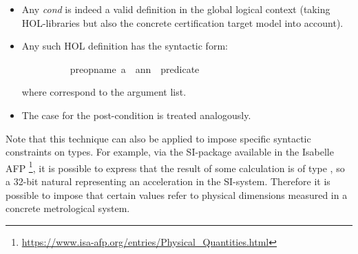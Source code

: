 \begin{isabellebody}
\begin{isamarkuptext}
%
\begin{itemize}%
\item Any \emph{cond} is indeed a valid definition in the global logical context
(taking HOL-libraries but also the concrete certification target model into account).

\item Any such HOL definition has the syntactic form:
\vspace{-0.3cm}

\begin{isabelle}
\ \ \ \ \ \ \ \ \ \ pre{\isacharunderscore}{\kern0pt}{\isacharless}{\kern0pt}op{\isacharunderscore}{\kern0pt}name{\isachargreater}{\kern0pt}\ {\isacharparenleft}{\kern0pt}a\ {\isachardot}{\kern0pt}{\isachardot}{\kern0pt}{\isachardot}{\kern0pt}\ {\isacharparenleft}{\kern0pt}a\isactrlsub n{\isacharcolon}{\kern0pt}{\isacharcolon}{\kern0pt}{\isasymtau}\isactrlsub n{\isacharparenright}{\kern0pt}\ {\isasymequiv}\ {\isacharless}{\kern0pt}predicate{\isachargreater}{\kern0pt}{\isacharcomma}{\kern0pt}
\end{isabelle}
\vspace{-0.3cm}
where  correspond to the argument list.

\item The case for the post-condition is treated analogously. %
\end{itemize}
\end{isamarkuptext}\isamarkuptrue%

\begin{isamarkuptext}
Note that this technique can also be applied to impose specific syntactic constraints on
types. For example, via the SI-package available in the Isabelle AFP
\footnote{\url{https://www.isa-afp.org/entries/Physical_Quantities.html}}, it is possible to express
that the result of some calculation is of type
, so a 32-bit natural representing an acceleration in the SI-system.
Therefore it is possible to impose that certain values refer to physical dimensions
measured in a concrete metrological system.
\end{isamarkuptext}\isamarkuptrue%


\end{isabellebody}
